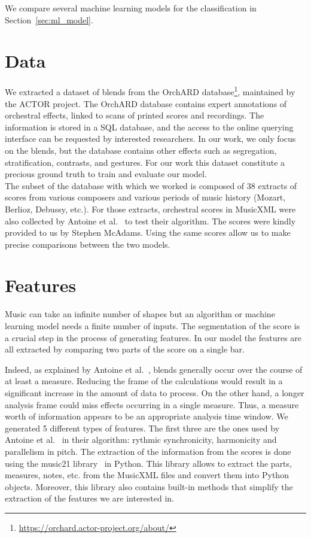 \documentclass{article}
\begin{document}
We compare several machine learning models for the classification in Section~\ref{sec:ml_model}.

\section{Data}\label{sec:data}

We extracted a dataset of blends from the OrchARD database\footnote[1]{\url{https://orchard.actor-project.org/about/}}, maintained by the ACTOR project. The OrchARD database contains expert annotations of orchestral effects, linked to scans of printed scores and recordings. The information is stored in a SQL database, and the access to the online querying interface can be requested by interested researchers. In our work, we only focus on the blends, but the database contains other effects such as segregation, stratification, contrasts, and gestures.
For our work this dataset constitute a precious ground truth to train and evaluate our model.\\
The subset of the database with which we worked is composed of 38 extracts of scores from various composers and various periods of music history (Mozart, Berlioz, Debussy, etc.). For those extracts, orchestral scores in MusicXML were also collected by Antoine et al.~\cite{antoine_blends} to test their algorithm. The scores were kindly provided to us by Stephen McAdams. Using the same scores allow us to make precise comparisons between the two models.

%
\section{Features}\label{sec:features}
%


Music can take an infinite number of shapes but an algorithm or machine learning model needs a finite number of inputs\cite{marsden2016}.
The segmentation of the score is a crucial step in the process of generating features.
In our model the features are all extracted by comparing two parts of the score on a single bar.


Indeed, as explained by Antoine et al.~\cite{antoine_blends}, blends generally occur over the course of at least a measure.
Reducing the frame of the calculations would result in a significant increase in the amount of data to process.
On the other hand, a longer analysis frame could miss effects occurring in a single measure.
Thus, a measure worth of information appears to be an appropriate analysis time window.
We generated 5 different types of features. The first three are the ones used by Antoine et al.~\cite{antoine_blends} in their algorithm: rythmic synchronicity, harmonicity and parallelism in pitch.
The extraction of the information from the scores is done using the music21 library~\cite{mit_users_2006} in Python.
This library allows to extract the parts, measures, notes, etc. from the MusicXML files and convert them into Python objects.
Moreover, this library also contains built-in methods that simplify the extraction of the features we are interested in.
\end{document}
